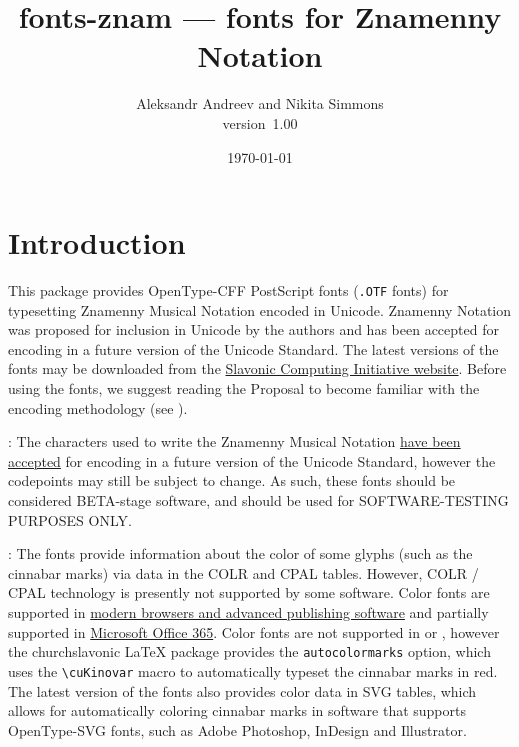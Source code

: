 \documentclass[11pt]{article}
\def\fileversion{1.00}
\def\pkg#1{\textsf{#1}}
\def\cs#1{\texttt{\textbackslash #1}}
\begin{document}
\title{\pkg{fonts-znam} --- fonts for Znamenny Notation}
\author{Aleksandr Andreev and Nikita Simmons\\version~\fileversion}
\date{\today}
\maketitle

\tableofcontents

\section{Introduction}
This package provides OpenType-CFF PostScript fonts (\texttt{.OTF} fonts)
for typesetting Znamenny Musical Notation encoded in Unicode. Znamenny
Notation was proposed for inclusion in Unicode by the authors and has
been accepted for encoding in a future version of the Unicode Standard.
The latest versions of the fonts may be downloaded from the
\href{https://sci.ponomar.net/music.html}{Slavonic Computing Initiative website}.
Before using the fonts, we suggest reading the Proposal to become familiar with
the encoding methodology (see \cite{PROP}).

: The characters used to write the Znamenny Musical Notation
\href{http://www.unicode.org/alloc/Pipeline.html}{have been accepted}
for encoding in a future version of the Unicode Standard,
however the codepoints may still be subject to change. As such,
these fonts should be considered BETA-stage software, and should be used
for SOFTWARE-TESTING PURPOSES ONLY.

: The fonts provide information about the color of some
glyphs (such as the cinnabar marks) via data in the COLR and CPAL tables.
However, COLR / CPAL technology is presently not supported by some software.
Color fonts are supported in \href{https://www.colorfonts.wtf/}{modern browsers
and advanced publishing software} and partially supported in
\href{https://office-watch.com/2019/color-font-support-in-microsoft-office-the-story-so-far/}{Microsoft
Office 365}. Color fonts are not supported in \XeTeX{} or \LuaTeX{}, however
the \pkg{churchslavonic} \LaTeX{} package provides the \texttt{autocolormarks} option,
which uses the \cs{cuKinovar} macro to automatically typeset the cinnabar marks in red.
The latest version of the fonts also provides color data in SVG tables,
which allows for automatically coloring cinnabar marks in software that
supports OpenType-SVG fonts, such as Adobe Photoshop, InDesign and Illustrator.
\end{document}
